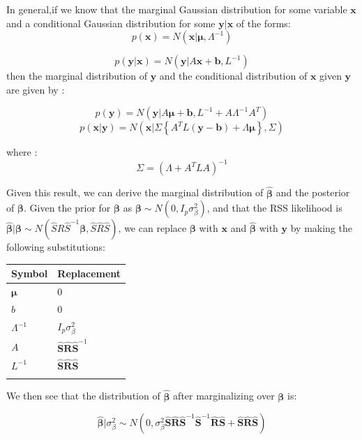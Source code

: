 In general,if we know that the marginal Gaussian distribution for some variable \(\textbf{x}\) and a conditional Gaussian distribution for some \(\textbf{y}|\textbf{x}\) of the forms:
$$p(\textbf{x}) = N(\textbf{x}|\boldsymbol{\mu},\Lambda^{-1})$$

$$p(\textbf{y}|\textbf{x}) = N(\textbf{y}|A\textbf{x}+\textbf{b},L^{-1})$$
then the marginal distribution of \(\textbf{y}\) and the conditional distribution of \(\textbf{x}\) given \(\textbf{y}\) are given by \cite{patternrecognition}: 

$$ p(\textbf{y}) = N(\textbf{y}|A\boldsymbol{\mu}+\textbf{b},L^{-1}+A\Lambda^{-1}A^{T})$$
$$p(\textbf{x}|\textbf{y}) = N(\textbf{x}| \Sigma \left\{ A^{T} L ( \textbf{y} - \textbf{b} ) + \Lambda \boldsymbol{\mu} \right\} , \Sigma)$$

where :
$$\Sigma = (\Lambda + A^{T}LA)^{-1}$$

Given this result, we can derive the marginal distribution of $\hat{\boldsymbol{\beta}}$ and the posterior of \(\boldsymbol{\beta}\). Given the prior for \(\boldsymbol{\beta}\) as \(\boldsymbol{\beta} \sim N(0,I_p\sigma^2_\beta)\), and that the RSS likelihood is \(\hat{\boldsymbol{\beta}} | \boldsymbol{\beta} \sim N(\hat{S}\hat{R}\hat{S}^{-1}\boldsymbol{\beta},\hat{S}\hat{R}\hat{S})\),  
we can replace \(\boldsymbol{\beta}\) with \(\textbf{x}\) and \(\hat{\boldsymbol{\beta}}\) with \(\textbf{y}\) by making the following substitutions:

\begin{center}
\begin{tabular}{ll}
Symbol & Replacement\\
\hline
\(\boldsymbol{\mu}\) & \(0\)\\
\(b\) & \(0\)\\
\(\Lambda^{-1}\) & \(I_p \sigma^2_\beta\)\\
\(A\) & \(\hat{\textbf{S}}\hat{\textbf{R}}\hat{\textbf{S}}^{-1}\)\\
\(L^{-1}\) & \(\hat{\textbf{S}}\hat{\textbf{R}}\hat{\textbf{S}}\)\\
 & \\
\end{tabular}
\end{center}

We then see that the distribution of \(\hat{\boldsymbol{\beta}}\) after marginalizing over $\boldsymbol{\beta}$ is:

$$ \hat{\boldsymbol{\beta}}|\sigma_\beta^2 \sim N(0,\sigma_\beta^2\hat{\textbf{S}}\hat{\textbf{R}}\hat{\textbf{S}}^{-1}\hat{\textbf{S}}^{-1}\hat{\textbf{R}}\hat{\textbf{S}}+\hat{\textbf{S}}\hat{\textbf{R}}\hat{\textbf{S}})$$ 


